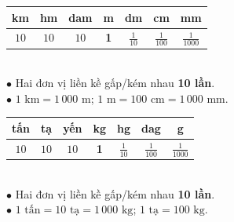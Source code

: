\documentclass[14pt,a4paper,oneside]{extbook}
\begin{document}
\noindent
\begin{minipage}[t]{0.50\textwidth}
  \begin{tcolorbox}[
    enhanced,
    title={\footnotesize\bfseries\color{white}\faRuler\ 2. Bảng đơn vị đo độ dài},
    colback=purple!2!white,
    colframe=purple!70!black,
    arc=2.5mm, boxrule=0.8pt, top=1.8mm, bottom=1.8mm, left=1.8mm, right=1.8mm
  ]
    \scriptsize
    \begin{tabular}{|c|c|c|c|c|c|c|}
      \hline
      km & hm & dam & \textbf{m} & dm & cm & mm \\ \hline
      $10$ & $10$ & $10$ & \textbf{1} & $\frac{1}{10}$ & $\frac{1}{100}$ & $\frac{1}{1000}$ \\ \hline
    \end{tabular}\\[3pt]
    $\bullet$ Hai đơn vị liền kề gấp/kém nhau \textbf{10 lần}.\\
    $\bullet$ $1\text{ km} = 1\,000\text{ m}$; $1\text{ m} = 100\text{ cm} = 1\,000\text{ mm}$.
  \end{tcolorbox}
\end{minipage}%
\hfill
\begin{minipage}[t]{0.48\textwidth}
  \begin{tcolorbox}[
    enhanced,
    title={\footnotesize\bfseries\color{white}\faBalanceScale\ 3. Bảng đơn vị đo khối lượng},
    colback=teal!2!white,
    colframe=teal!75!black,
    arc=2.5mm, boxrule=0.8pt, top=1.8mm, bottom=1.8mm, left=1.8mm, right=1.8mm
  ]
    \scriptsize
    \begin{tabular}{|c|c|c|c|c|c|c|}
      \hline
      tấn & tạ & yến & \textbf{kg} & hg & dag & g \\ \hline
      $10$ & $10$ & $10$ & \textbf{1} & $\frac{1}{10}$ & $\frac{1}{100}$ & $\frac{1}{1000}$ \\ \hline
    \end{tabular}\\[3pt]
    $\bullet$ Hai đơn vị liền kề gấp/kém nhau \textbf{10 lần}.\\
    $\bullet$ $1\text{ tấn} = 10\text{ tạ} = 1\,000\text{ kg}$; $1\text{ tạ} = 100\text{ kg}$.
  \end{tcolorbox}
\end{minipage}

\vspace{3mm}
\end{document}
